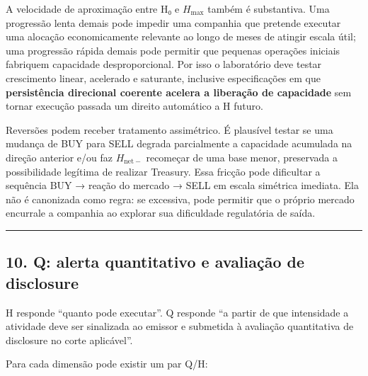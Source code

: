 \documentclass[
  a4paper,
]{article}
\begin{document}
A velocidade de aproximação entre H₀ e \(H_{\max}\) também é
substantiva. Uma progressão lenta demais pode impedir uma companhia que
pretende executar uma alocação economicamente relevante ao longo de
meses de atingir escala útil; uma progressão rápida demais pode permitir
que pequenas operações iniciais fabriquem capacidade desproporcional.
Por isso o laboratório deve testar crescimento linear, acelerado e
saturante, inclusive especificações em que \textbf{persistência
direcional coerente acelera a liberação de capacidade} sem tornar
execução passada um direito automático a H futuro.

Reversões podem receber tratamento assimétrico. É plausível testar se
uma mudança de BUY para SELL degrada parcialmente a capacidade acumulada
na direção anterior e/ou faz \(H_{\mathrm{net}-}\) recomeçar de uma base
menor, preservada a possibilidade legítima de realizar Treasury. Essa
fricção pode dificultar a sequência BUY → reação do mercado → SELL em
escala simétrica imediata. Ela não é canonizada como regra: se
excessiva, pode permitir que o próprio mercado encurrale a companhia ao
explorar sua dificuldade regulatória de saída.

\begin{center}\rule{0.5\linewidth}{0.5pt}\end{center}

\hypertarget{10-q-quando-a-utilizacao-da-capacidade-obriga-disclosure}{}

\hypertarget{10-q-alerta-quantitativo-e-avaliauxe7uxe3o-de-disclosure}{%
\subsection{10. Q: alerta quantitativo e avaliação de
disclosure}\label{10-q-alerta-quantitativo-e-avaliauxe7uxe3o-de-disclosure}}

H responde ``quanto pode executar''. Q responde ``a partir de que
intensidade a atividade deve ser sinalizada ao emissor e submetida à
avaliação quantitativa de disclosure no corte aplicável''.

Para cada dimensão pode existir um par Q/H:
\end{document}
